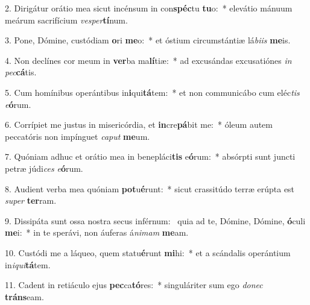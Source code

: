 2. Dirigátur orátio mea sicut incénsum in con\textbf{spéc}tu \textbf{tu}o:~*  elevátio mánuum meárum sacrifícium \textit{ves}\textit{per}\textbf{tí}num.\

3. Pone, Dómine, custódiam \textbf{o}ri \textbf{me}o:~*  et óstium circumstántiæ lá\textit{bi}\textit{is} \textbf{me}is.\

4. Non declínes cor meum in \textbf{ver}ba ma\textbf{lí}tiæ:~*  ad excusándas excusatiónes \textit{in} \textit{pec}\textbf{cá}tis.\

5. Cum homínibus operántibus in\textbf{i}qui\textbf{tá}tem:~*  et non communicábo cum eléc\textit{tis} \textit{e}\textbf{ó}rum.\

6. Corrípiet me justus in misericórdia, et \textbf{in}cre\textbf{pá}bit me:~*  óleum autem peccatóris non impínguet \textit{ca}\textit{put} \textbf{me}um.\

7. Quóniam adhuc et orátio mea in benepláci\textbf{tis} e\textbf{ó}rum:~*  absórpti sunt juncti petræ júdi\textit{ces} \textit{e}\textbf{ó}rum.\

8. Audient verba mea quóniam \textbf{pot}u\textbf{é}runt:~*  sicut crassitúdo terræ erúpta est \textit{su}\textit{per} \textbf{ter}ram.\

9. Dissipáta sunt ossa nostra secus inférnum: \dag\  quia ad te, Dómine, Dómine, \textbf{ó}culi \textbf{me}i:~*  in te sperávi, non áuferas á\textit{ni}\textit{mam} \textbf{me}am.\

10. Custódi me a láqueo, quem statu\textbf{é}runt \textbf{mi}hi:~*  et a scándalis operántium in\textit{i}\textit{qui}\textbf{tá}tem.\

11. Cadent in retiáculo ejus \textbf{pec}ca\textbf{tó}res:~*  singuláriter sum ego \textit{do}\textit{nec} \textbf{tráns}eam.\

